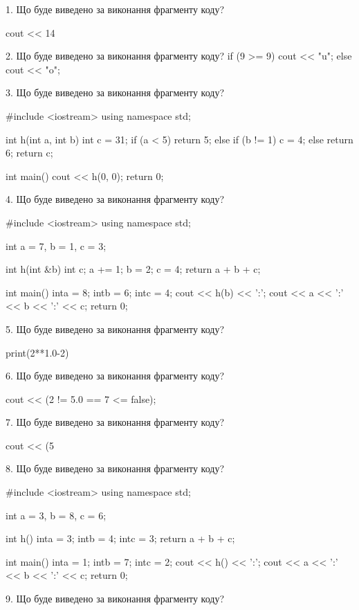 \documentclass[11pt]{article}
\begin{document}
1. Що буде виведено за виконання фрагменту коду?

cout << 14 %

2. Що буде виведено за виконання фрагменту коду?
if (9 >= 9)
    cout << "u";
else
    cout << "o";


3. Що буде виведено за виконання фрагменту коду?

#include <iostream>
using namespace std;

int h(int a, int b){
    int c = 31;
    if (a < 5)
        return 5;
    else if (b != 1)
         c = 4;
    else 
        return 6;
    return c;
}

int main(){
    cout << h(0, 0);
    return 0;
}

4. Що буде виведено за виконання фрагменту коду?

#include <iostream>
using namespace std;

int a = 7, b = 1, c = 3;

int h(int &b){
int c;    a += 1;
    b = 2;
    c = 4;
    return a + b + c;
}

int main(){
    inta = 8;
    intb = 6;
    intc = 4;
    cout << h(b) << ':';
    cout << a << ':' << b << ':' << c;
    return 0; 
}

5. Що буде виведено за виконання фрагменту коду?

print(2**1.0-2)

6. Що буде виведено за виконання фрагменту коду?

cout << (2 != 5.0 == 7 <= false);

7. Що буде виведено за виконання фрагменту коду?

cout << (5 %

8. Що буде виведено за виконання фрагменту коду?

#include <iostream>
using namespace std;

int a = 3, b = 8, c = 6;

int h(){
    inta = 3;
    intb = 4;
    intc = 3;
    return a + b + c;
}

int main(){
    inta = 1;
    intb = 7;
    intc = 2;
    cout << h() << ':';
    cout << a << ':' << b << ':' << c;
    return 0;
}

9. Що буде виведено за виконання фрагменту коду?
\end{document}
